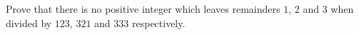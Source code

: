 Prove that there is no positive integer which leaves remainders $1$, $2$ and $3$ when divided by $123$, $321$ and $333$ respectively.
